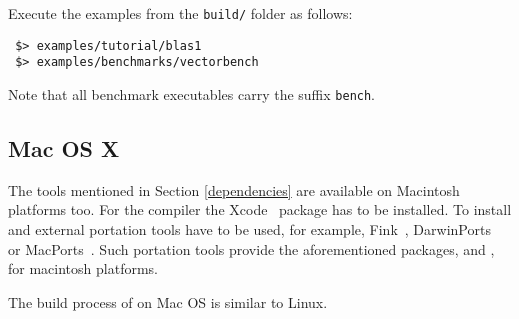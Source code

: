 
Execute the examples from the \lstinline|build/| folder as follows:
\begin{lstlisting}
 $> examples/tutorial/blas1
 $> examples/benchmarks/vectorbench
\end{lstlisting}
Note that all benchmark executables carry the suffix \lstinline|bench|. 


\subsection{Mac OS X}
\label{apple}
The tools mentioned in Section \ref{dependencies} are available on 
Macintosh platforms too. 
For the {\GCC} compiler the Xcode~\cite{xcode} package has to be installed.
To install {\CMake} and {\Boost} external portation tools have to be used, 
for example, Fink~\cite{fink}, DarwinPorts~\cite{darwinports} 
or MacPorts~\cite{macports}. Such portation tools provide the 
aforementioned packages, {\CMake} and {\Boost}, for macintosh platforms. 


The build process of {\ViennaCL} on Mac OS is similar to Linux.

